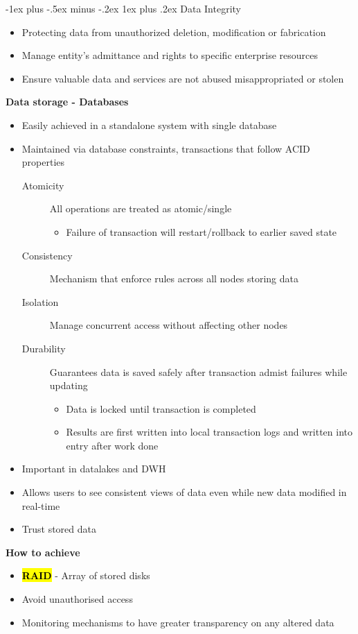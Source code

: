 \documentclass{article}
\makeatletter
\renewcommand{\subsubsection}{\@startsection{subsubsection}{3}{0mm}%
    {-1ex plus -.5ex minus -.2ex}%
    {1ex plus .2ex}%
{\normalfont\small\bfseries}}%
\newcommand{\keyword}[2][]{\sethlcolor{highlight}\hl{\textbf{#2}} #1 - }
\makeatother
\begin{document}
\begin{multicols*}{3}
\subsubsection{Data Integrity}
\begin{itemize}
	\item Protecting data from unauthorized deletion, modification or fabrication
	\item Manage entity's admittance and rights to specific enterprise resources 
	\item Ensure valuable data and services are not abused misappropriated or stolen
\end{itemize}
\textbf{Data storage - Databases}
\begin{itemize}
	\item Easily achieved in a standalone system with single database
	\item Maintained via database constraints, transactions that follow ACID properties
	\begin{description}
		\item[Atomicity]{All operations are treated as atomic/single}
		\begin{itemize}
			\item Failure of transaction will restart/rollback to earlier saved state
		\end{itemize}
		\item[Consistency]{Mechanism that enforce rules across all nodes storing data}
		\item[Isolation]{Manage concurrent access without affecting other nodes}
		\item[Durability]{Guarantees data is saved safely after transaction admist failures while updating}
		\begin{itemize}
			\item Data is locked until transaction is completed
			\item Results are first written into local transaction logs and written into entry after work done
		\end{itemize}
	\end{description}
	\item Important in datalakes and DWH
	\item Allows users to see consistent views of data even while new data modified in real-time
	\item Trust stored data
\end{itemize}
\textbf{How to achieve}
\begin{itemize}
	\item \keyword{RAID}{Array of stored disks}
	\item Avoid unauthorised access
	\item Monitoring mechanisms to have greater transparency on any altered data
\end{itemize}

\end{multicols*}
\end{document}
